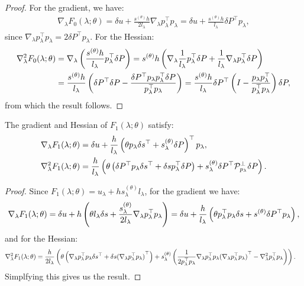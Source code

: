 \documentclass[eikonal.tex]{subfiles}
\begin{document}
\begin{proof}
  For the gradient, we have:
  \begin{align*}
    \nabla_\lambda F_0(\lambda; \theta) = \delta u + \frac{s^{(\theta)} h}{2 l_\lambda} \nabla_\lambda p_\lambda^\top p_\lambda = \delta u + \frac{s^{(\theta)} h}{l_\lambda} \delta P^\top p_\lambda,
  \end{align*}
  since
  $\nabla_\lambda p_\lambda^\top p_\lambda = 2 \delta P^\top
  p_\lambda$. For the Hessian:
  \begin{align*}
    \nabla^2_\lambda F_0(\lambda; \theta) &= \nabla_\lambda \left(\frac{s^{(\theta)} h}{l_\lambda} p_\lambda^\top \delta P\right) = s^{(\theta)} h \left(\nabla_\lambda \frac{1}{l_\lambda} p_\lambda^\top \delta P + \frac{1}{l_\lambda} \nabla_\lambda p_\lambda^\top \delta P\right) \\
    &= \frac{s^{(\theta)} h}{l_\lambda} \left(\delta P^\top \delta P - \frac{\delta P^\top p_\lambda p_\lambda^\top \delta P}{p_\lambda^\top p_\lambda}\right) = \frac{s^{(\theta)} h}{l_\lambda} \delta P^\top \left(I - \frac{p_\lambda p_\lambda^\top}{p_\lambda^\top p_\lambda}\right) \delta P,
  \end{align*}
  from which the result follows.
\end{proof}

\begin{lemma}\label{lemma:F1-grad-and-Hess}
  The gradient and Hessian of $F_1(\lambda; \theta)$ satisfy:
  \begin{align}
    \nabla_\lambda F_1(\lambda; \theta) &= \delta u + \frac{h}{l_\lambda} \left(\theta p_\lambda \delta s^\top + s^{(\theta)}_\lambda \delta P\right)^\top p_\lambda, \\
    \nabla_\lambda^2 F_1(\lambda; \theta) &= \frac{h}{l_\lambda} \left(\theta \left(\delta P^\top p_\lambda \delta s^\top + \delta s p_\lambda^\top \delta P\right) + s^{(\theta)}_\lambda \delta P^\top \mathcal{P}^\perp_{p_\lambda} \delta P\right).
  \end{align}
\end{lemma}

\begin{proof}
  Since $F_1(\lambda; \theta) = u_\lambda + h s^{(\theta)}_\lambda l_\lambda$, for the gradient we have:
  \begin{align*}
    \nabla_\lambda F_1(\lambda; \theta) = \delta u + h \left(\theta l_\lambda \delta s + \frac{s^{(\theta)}_\lambda}{2l_\lambda} \nabla_\lambda p_\lambda^\top p_\lambda\right) = \delta u + \frac{h}{l_\lambda} \left(\theta p_\lambda^\top p_\lambda \delta s + s^{(\theta)} \delta P^\top p_\lambda\right),
  \end{align*}
  and for the Hessian:
  \begin{align*}
    \nabla_\lambda^2 F_1(\lambda; \theta) &= \frac{h}{2 l_\lambda} \left(\theta \left(\nabla_\lambda p_\lambda^\top p_\lambda \delta s^\top + \delta s {(\nabla_\lambda p_\lambda^\top p_\lambda)}^\top\right) + s^{(\theta)}_\lambda \left(\frac{1}{2 p_\lambda^\top p_\lambda} \nabla_\lambda p_\lambda^\top p_\lambda {(\nabla_\lambda p_\lambda^\top p_\lambda)}^\top - \nabla^2_\lambda p_\lambda^\top p_\lambda\right)\right).
  \end{align*}
  Simplfying this gives us the result.
\end{proof}
\end{document}
